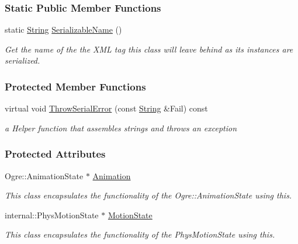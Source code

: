 \subsubsection*{Static Public Member Functions}
\begin{DoxyCompactItemize}
\item 
static \hyperlink{namespaceMezzanine_acf9fcc130e6ebf08e3d8491aebcf1c86}{String} \hyperlink{classMezzanine_1_1ActorBase_af6f41bdc0932b99f82f317d27d8dc906}{SerializableName} ()
\begin{DoxyCompactList}\small\item\em Get the name of the the XML tag this class will leave behind as its instances are serialized. \item\end{DoxyCompactList}\end{DoxyCompactItemize}
\subsubsection*{Protected Member Functions}
\begin{DoxyCompactItemize}
\item 
virtual void \hyperlink{classMezzanine_1_1ActorBase_a24d196b9fc55048fb183a7920b5bbd3e}{ThrowSerialError} (const \hyperlink{namespaceMezzanine_acf9fcc130e6ebf08e3d8491aebcf1c86}{String} \&Fail) const 
\begin{DoxyCompactList}\small\item\em a Helper function that assembles strings and throws an exception \item\end{DoxyCompactList}\end{DoxyCompactItemize}
\subsubsection*{Protected Attributes}
\begin{DoxyCompactItemize}
\item 
\hypertarget{classMezzanine_1_1ActorBase_ae71259b98aed5a9c269e0758344d36a7}{
Ogre::AnimationState $\ast$ \hyperlink{classMezzanine_1_1ActorBase_ae71259b98aed5a9c269e0758344d36a7}{Animation}}
\label{classMezzanine_1_1ActorBase_ae71259b98aed5a9c269e0758344d36a7}

\begin{DoxyCompactList}\small\item\em This class encapsulates the functionality of the Ogre::AnimationState using this. \item\end{DoxyCompactList}\item 
\hypertarget{classMezzanine_1_1ActorBase_a073d5307c4cb7a82f13133e8216f797b}{
internal::PhysMotionState $\ast$ \hyperlink{classMezzanine_1_1ActorBase_a073d5307c4cb7a82f13133e8216f797b}{MotionState}}
\label{classMezzanine_1_1ActorBase_a073d5307c4cb7a82f13133e8216f797b}

\begin{DoxyCompactList}\small\item\em This class encapsulates the functionality of the PhysMotionState using this. \item\end{DoxyCompactList}\end{DoxyCompactItemize}
